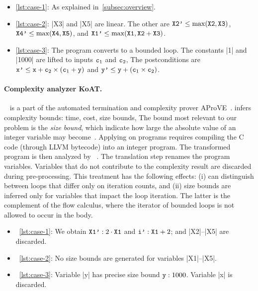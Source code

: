 \begin{itemize}

\item \autoref{lst:case-1}: As explained in~\autoref{subsec:overview}.

\item \autoref{lst:case-2}: \pr|X3| and \pr|X5| are linear.
The other are
\(\prm{X2'}\leq\max(\prm{X2},\prm{X3})\),
\( \prm{X4'}\leq\max(\prm{X4},\prm{X5})\), and
\(\prm{X1'}\leq\max(\prm{X1},\prm{X2}+\prm{X3})\).%

\item \autoref{lst:case-3}: The program converts to a bounded loop.
The constants \pr|1| and \pr|1000| are lifted to inputs \(\prm{c}_1\) and \(\prm{c}_2\), \resp
The postconditions are \(\prm{x'}\leq\prm{x}+\prm{c}_2\times(\prm{c}_1 + \prm{y})\) and \(\prm{y'}\leq\prm{y}+(\prm{c}_1\times\prm{c}_2)\).

\end{itemize}

\paragraph{Complexity analyzer KoAT.}
~\cite{koat} is a part of the automated termination and complexity prover AProVE~\cite{giesl2016}.
 infers complexity bounds: time, cost, size bounds, \etc
The bound most relevant to our problem is the \emph{size bound},
which indicate how large the absolute value of an integer variable may become~\cite{lommen2023}.
Applying  on  programs requires compiling the C code (through LLVM bytecode) into an integer program.
The transformed program is then analyzed by ~\cite{giesl2022}.
The translation step renames the program variables.
Variables that do not contribute to the complexity result are discarded during pre-processing.
This treatment has the following effects:
(i)  can distinguish between loops that differ only on iteration counts, and
(ii) size bounds are inferred only for variables that impact the loop iteration.
The latter is the complement of the flow calculus, where the iterator of bounded loops is not allowed to occur in the body.

\begin{itemize}
\item~\autoref{lst:case-1}: We obtain \(\prm{X1'} : 2 \cdot \prm{X1}\) and \(\prm{i'}: \prm{X1}+ 2\); and \pr|X2|--\pr|X5| are discarded.

\item~\autoref{lst:case-2}: No size bounds are generated for variables \pr|X1|--\pr|X5|.

\item~\autoref{lst:case-3}: Variable \pr|y| has precise size bound \(\prm{y}: 1000\). Variable \pr|x| is discarded.
\end{itemize}

